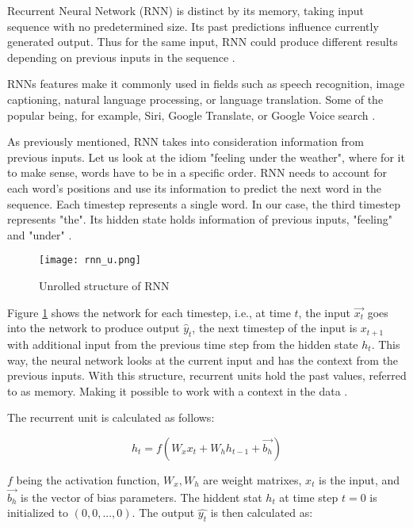 Recurrent Neural Network (RNN) is distinct by its memory, taking input sequence with no predetermined size. Its past predictions influence currently generated output. Thus for the same input, RNN could produce different results depending on previous inputs in the sequence \cite{rnnDSmedium}.

RNNs features make it commonly used in fields such as speech recognition, image captioning, natural language processing, or language translation. Some of the popular being, for example, Siri, Google Translate, or Google Voice search \cite{ibmrnn}.

As previously mentioned, RNN takes into consideration information from previous inputs. Let us look at the idiom "feeling under the weather", where for it to make sense, words have to be in a specific order. RNN needs to account for each word's positions and use its information to predict the next word in the sequence. Each timestep represents a single word. In our case, the third timestep represents "the". Its hidden state holds information of previous inputs, "feeling" and "under" \cite{ibmrnn}.

\begin{figure}[h]
    \centering
    \texttt{[image: rnn\_u.png]}
    \caption{Unrolled structure of RNN \cite{matous}}
    \label{fig:rnn}
\end{figure}


Figure \ref{fig:rnn} shows the network for each timestep, i.e., at time $t$, the input $\vec{x_t}$ goes into the network to produce output $\hat{y}_t$, the next timestep of the input is $x_{t+1}$ with additional input from the previous time step from the hidden state $h_{t}$. This way, the neural network looks at the current input and has the context from the previous inputs.
With this structure, recurrent units hold the past values, referred to as memory. Making it possible to work with a context in the data \cite{rnnin6}.

The recurrent unit is calculated as follows:

\begin{equation}
    {h_t = f(W_{x}x_t + W_{h}h_{t-1}+\vec{b_h})}
\end{equation}

$f$ being the activation function, $W_x,W_h$ are weight matrixes, $x_t$ is the input, and $\vec{b_h}$ is the vector of bias parameters. The hiddent stat $h_t$ at time step $t=0$ is initialized to $(0,0,...,0)$. The output $\hat{y_t}$ is then calculated as:

